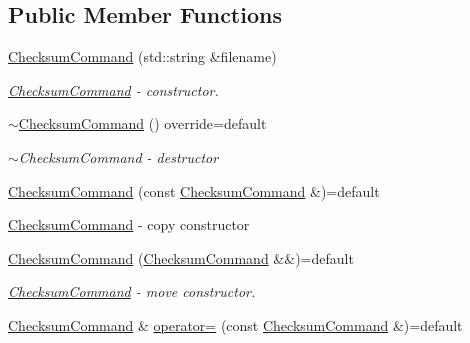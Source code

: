 \subsection*{Public Member Functions}
\begin{DoxyCompactItemize}
\item 
\hyperlink{classtwo__gis__test_1_1command__handler_1_1_checksum_command_acd066f41f0b20846b6e593026695bdf5}{Checksum\+Command} (std\+::string \&filename)
\begin{DoxyCompactList}\small\item\em \hyperlink{classtwo__gis__test_1_1command__handler_1_1_checksum_command}{Checksum\+Command} -\/ constructor. \end{DoxyCompactList}\item 
\hyperlink{classtwo__gis__test_1_1command__handler_1_1_checksum_command_aba52fa430b7d227712e5edec74c78c20}{$\sim$\+Checksum\+Command} () override=default
\begin{DoxyCompactList}\small\item\em $\sim$\+Checksum\+Command -\/ destructor \end{DoxyCompactList}\item 
\hyperlink{classtwo__gis__test_1_1command__handler_1_1_checksum_command_a4be9b91a048631fdd97bcf28f2948cda}{Checksum\+Command} (const \hyperlink{classtwo__gis__test_1_1command__handler_1_1_checksum_command}{Checksum\+Command} \&)=default
\begin{DoxyCompactList}\small\item\em 
\begin{DoxyItemize}
\item \hyperlink{classtwo__gis__test_1_1command__handler_1_1_checksum_command}{Checksum\+Command} -\/ copy constructor 
\end{DoxyItemize}\end{DoxyCompactList}\item 
\hyperlink{classtwo__gis__test_1_1command__handler_1_1_checksum_command_a67da47fcd7e8d659ef8e030e5cd5fb2f}{Checksum\+Command} (\hyperlink{classtwo__gis__test_1_1command__handler_1_1_checksum_command}{Checksum\+Command} \&\&)=default
\begin{DoxyCompactList}\small\item\em \hyperlink{classtwo__gis__test_1_1command__handler_1_1_checksum_command}{Checksum\+Command} -\/ move constructor. \end{DoxyCompactList}\item 
\hyperlink{classtwo__gis__test_1_1command__handler_1_1_checksum_command}{Checksum\+Command} \& \hyperlink{classtwo__gis__test_1_1command__handler_1_1_checksum_command_a7603c6b9136cba7074cac4deb37e44ef}{operator=} (const \hyperlink{classtwo__gis__test_1_1command__handler_1_1_checksum_command}{Checksum\+Command} \&)=default

\end{DoxyCompactItemize}

